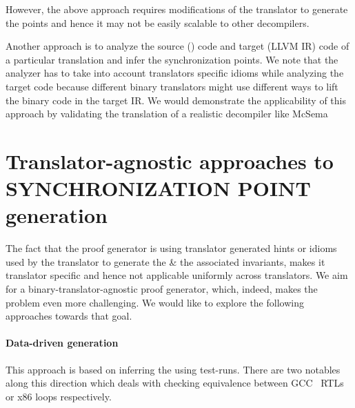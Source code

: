 However, the above approach requires modifications of the translator to
generate the \syncp points and hence it may not be easily scalable to other
decompilers. 

Another approach is to analyze the source (\ISA) code and target (LLVM IR) code
of a particular translation  and infer the synchronization points.
We note that the analyzer has to take into account translators specific idioms
while analyzing the target code because different binary translators might use
different ways to lift the binary code in the target IR. We would demonstrate
the applicability of this approach by validating the translation of a realistic
decompiler like McSema~\cite{McSema:Recon14}

\section{Translator-agnostic approaches to SYNCHRONIZATION POINT
  generation}\label{sec:TA}

The fact that the proof generator is using translator generated hints or idioms used by the translator
to  generate the \syncps \& the associated  invariants,  makes it  translator specific and hence not applicable
uniformly across translators. We aim for a  binary-translator-agnostic proof
generator, which, indeed, makes the problem  even more challenging. We would
like to explore the following  approaches towards that goal.

\paragraph{\textbf{Data-driven \syncp generation}} This approach
is based on inferring the \syncps using test-runs. There are two
notables~\cite{Iman2005,DDEC:OOPSLA:2013} along this direction which
deals with checking equivalence between GCC~\cite{GCC} RTLs or x86 loops respectively.

